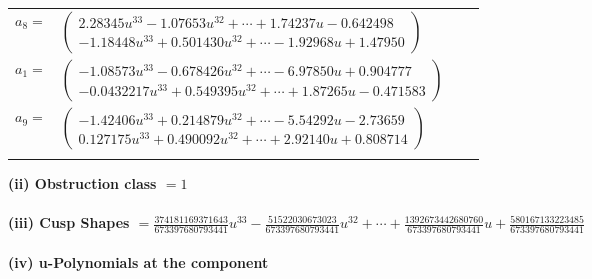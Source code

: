 \documentclass[1p]{elsarticle_modified}
\theoremstyle{definition}
\begin{document}
\begin{tabular}{m{7pt} m{180pt} m{7pt} m{180pt} }
\flushright $a_{8}=$&$\begin{pmatrix}2.28345 u^{33}-1.07653 u^{32}+\cdots+1.74237 u-0.642498\\-1.18448 u^{33}+0.501430 u^{32}+\cdots-1.92968 u+1.47950\end{pmatrix}$ \\
\flushright $a_{1}=$&$\begin{pmatrix}-1.08573 u^{33}-0.678426 u^{32}+\cdots-6.97850 u+0.904777\\-0.0432217 u^{33}+0.549395 u^{32}+\cdots+1.87265 u-0.471583\end{pmatrix}$ \\
\flushright $a_{9}=$&$\begin{pmatrix}-1.42406 u^{33}+0.214879 u^{32}+\cdots-5.54292 u-2.73659\\0.127175 u^{33}+0.490092 u^{32}+\cdots+2.92140 u+0.808714\end{pmatrix}$\\&\end{tabular}
\flushleft \textbf{(ii) Obstruction class $= 1$}\\~\\
\flushleft \textbf{(iii) Cusp Shapes $= \frac{374181169371643}{673397680793441} u^{33}-\frac{51522030673023}{673397680793441} u^{32}+\cdots+\frac{1392673442680760}{673397680793441} u+\frac{580167133223485}{673397680793441}$}\\~\\
\newpage\renewcommand{\arraystretch}{1}
\flushleft \textbf{(iv) u-Polynomials at the component}\newline \\
\end{document}
